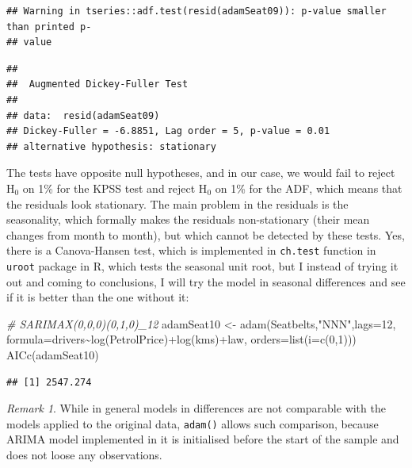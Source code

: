 \documentclass[
]{book}
\newenvironment{Shaded}{\begin{snugshade}}{\end{snugshade}}
\newcommand{\AttributeTok}[1]{\textcolor[rgb]{0.77,0.63,0.00}{#1}}
\newcommand{\CommentTok}[1]{\textcolor[rgb]{0.56,0.35,0.01}{\textit{#1}}}
\newcommand{\DecValTok}[1]{\textcolor[rgb]{0.00,0.00,0.81}{#1}}
\newcommand{\FunctionTok}[1]{\textcolor[rgb]{0.00,0.00,0.00}{#1}}
\newcommand{\NormalTok}[1]{#1}
\newcommand{\OtherTok}[1]{\textcolor[rgb]{0.56,0.35,0.01}{#1}}
\newcommand{\SpecialCharTok}[1]{\textcolor[rgb]{0.00,0.00,0.00}{#1}}
\newcommand{\StringTok}[1]{\textcolor[rgb]{0.31,0.60,0.02}{#1}}
\theoremstyle{definition}
\theoremstyle{definition}
\theoremstyle{definition}
\theoremstyle{definition}
\theoremstyle{remark}
\newtheorem*{remark}{Remark}
\begin{document}
\begin{verbatim}
## Warning in tseries::adf.test(resid(adamSeat09)): p-value smaller than printed p-
## value
\end{verbatim}

\begin{verbatim}
## 
##  Augmented Dickey-Fuller Test
## 
## data:  resid(adamSeat09)
## Dickey-Fuller = -6.8851, Lag order = 5, p-value = 0.01
## alternative hypothesis: stationary
\end{verbatim}

The tests have opposite null hypotheses, and in our case, we would fail to reject H\(_0\) on 1\% for the KPSS test and reject H\(_0\) on 1\% for the ADF, which means that the residuals look stationary. The main problem in the residuals is the seasonality, which formally makes the residuals non-stationary (their mean changes from month to month), but which cannot be detected by these tests. Yes, there is a Canova-Hansen test, which is implemented in \texttt{ch.test} function in \texttt{uroot} package in R, which tests the seasonal unit root, but I instead of trying it out and coming to conclusions, I will try the model in seasonal differences and see if it is better than the one without it:

\begin{Shaded}
\begin{Highlighting}[]
\CommentTok{\# SARIMAX(0,0,0)(0,1,0)\_12}
\NormalTok{adamSeat10 }\OtherTok{\textless{}{-}} \FunctionTok{adam}\NormalTok{(Seatbelts,}\StringTok{"NNN"}\NormalTok{,}\AttributeTok{lags=}\DecValTok{12}\NormalTok{,}
                   \AttributeTok{formula=}\NormalTok{drivers}\SpecialCharTok{\textasciitilde{}}\FunctionTok{log}\NormalTok{(PetrolPrice)}\SpecialCharTok{+}\FunctionTok{log}\NormalTok{(kms)}\SpecialCharTok{+}\NormalTok{law,}
                   \AttributeTok{orders=}\FunctionTok{list}\NormalTok{(}\AttributeTok{i=}\FunctionTok{c}\NormalTok{(}\DecValTok{0}\NormalTok{,}\DecValTok{1}\NormalTok{)))}
\FunctionTok{AICc}\NormalTok{(adamSeat10)}
\end{Highlighting}
\end{Shaded}

\begin{verbatim}
## [1] 2547.274
\end{verbatim}

\begin{remark}
While in general models in differences are not comparable with the models applied to the original data, \texttt{adam()} allows such comparison, because ARIMA model implemented in it is initialised before the start of the sample and does not loose any observations.
\end{remark}
\end{document}
